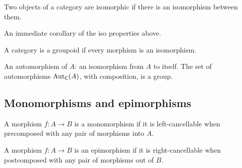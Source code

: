 \begin{definition}
  \label{def:prelims:obj-iso}
  \leanok
  Two objects of a category are isomorphic if there is an isomorphism
  between them.
\end{definition}

\begin{proposition}
  \label{prop:prelims:obj-iso-equiv-rel}
  An immediate corollary of the iso properties above.
\end{proposition}

\begin{definition}[Groupoid]
  \label{def:prelims:is-groupoid}
  \leanok
  A category is a groupoid if every morphism is an isomorphism.
\end{definition}

\begin{definition}[Automorphism]
  \label{def:prelims:aut}
  \leanok
  An automorphism of $A$: an isomorphism from $A$ to itself. The set
  of automorphisms $\operatorname{Aut}_{\mathsf{C}}(A)$, with composition, is a
  group.
\end{definition}

\subsection{Monomorphisms and epimorphisms}
\label{subsec:prelims:morphisms:monomorphisms-and-epimorphisms}

\begin{definition}[Monomorphism]
  \label{def:prelims:category-is-mono}
  \leanok
  A morphism $f : A \to B$ is a monomorphism if it is
  left-cancellable when precomposed with any pair of morphisms into
  $A$.
\end{definition}

\begin{definition}[Epimorphism]
  \label{def:prelims:category-is-epi}
  \leanok
  A morphism $f : A \to B$ is an epimorphism if it is
  right-cancellable when postcomposed with any pair of morphisms out
  of $B$.
\end{definition}

